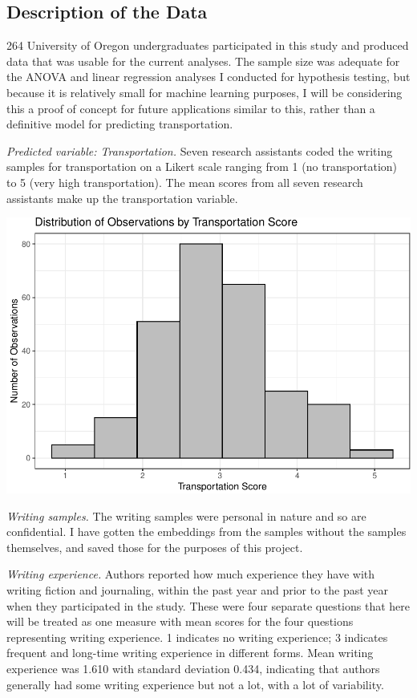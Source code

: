 \documentclass[
  man,floatsintext]{apa6}
\begin{document}
\hypertarget{description-of-the-data}{%
\subsection{Description of the Data}\label{description-of-the-data}}

264 University of Oregon undergraduates participated in this study and produced data that was usable for the current analyses. The sample size was adequate for the ANOVA and linear regression analyses I conducted for hypothesis testing, but because it is relatively small for machine learning purposes, I will be considering this a proof of concept for future applications similar to this, rather than a definitive model for predicting transportation.

\emph{Predicted variable: Transportation.} Seven research assistants coded the writing samples for transportation on a Likert scale ranging from 1 (no transportation) to 5 (very high transportation). The mean scores from all seven research assistants make up the transportation variable.

\includegraphics{Final_Eliott_files/figure-latex/unnamed-chunk-1-1.pdf}

\emph{Writing samples.} The writing samples were personal in nature and so are confidential. I have gotten the embeddings from the samples without the samples themselves, and saved those for the purposes of this project.

\emph{Writing experience.} Authors reported how much experience they have with writing fiction and journaling, within the past year and prior to the past year when they participated in the study. These were four separate questions that here will be treated as one measure with mean scores for the four questions representing writing experience. 1 indicates no writing experience; 3 indicates frequent and long-time writing experience in different forms. Mean writing experience was 1.610 with standard deviation 0.434, indicating that authors generally had some writing experience but not a lot, with a lot of variability.
\end{document}
